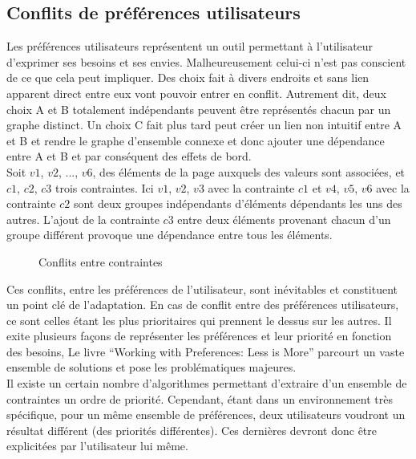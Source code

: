 \documentclass[french,a4paper]{report}
\begin{document}
{\subsection{Conflits de préférences utilisateurs}
Les préférences utilisateurs représentent un outil permettant à l'utilisateur
d'exprimer ses besoins et ses envies. Malheureusement celui-ci n'est pas
conscient de ce que cela peut impliquer. Des choix fait à divers endroits et
sans lien apparent direct entre eux vont pouvoir entrer en conflit. Autrement
dit, deux choix A et B totalement indépendants peuvent être représentés chacun
par un graphe distinct. Un choix C fait plus tard peut créer un lien non
intuitif entre A et B et rendre le graphe d'ensemble connexe et donc ajouter une
dépendance entre A et B et par conséquent des effets de bord.\\
Soit $v1$, $v2$, ..., $v6$, des éléments de la page auxquels des valeurs sont associées,
et $c1$, $c2$, $c3$ trois contraintes.
Ici $v1$, $v2$, $v3$ avec la contrainte $c1$ et $v4$, $v5$, $v6$ avec la contrainte $c2$
sont deux groupes indépendants d'éléments dépendants les uns des autres.
L'ajout de la contrainte $c3$ entre deux éléments provenant chacun d'un groupe différent
provoque une dépendance entre tous les éléments.
\begin{figure}[H]
\centering
{}
\caption{Conflits entre contraintes}
\end{figure}
Ces conflits, entre les préférences de l'utilisateur, sont inévitables et
constituent un point clé de l'adaptation. En cas de conflit entre des
préférences utilisateurs, ce sont celles étant
les plus prioritaires qui prennent le dessus sur les autres.
Il exite plusieurs façons de représenter les préférences et leur priorité en fonction
des besoins, Le livre \enquote{Working with Preferences: Less is More} \cite{kaci}
parcourt un vaste ensemble de solutions et pose les problématiques majeures.\\
Il existe un certain nombre d'algorithmes permettant d'extraire d'un ensemble de
contraintes un ordre de priorité. Cependant, étant dans un environnement très
spécifique, pour un même ensemble de préférences, deux utilisateurs voudront un
résultat différent (des priorités différentes). Ces dernières devront donc être
explicitées par l'utilisateur lui même.
}
\end{document}
